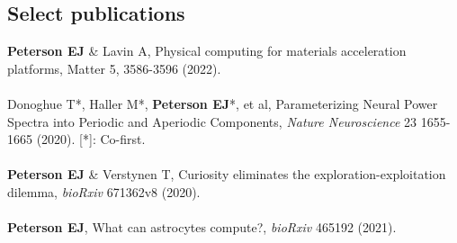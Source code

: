 \documentclass[margin,line]{res}
\begin{document}
\begin{resume}
\section{\sc Select publications}
\textbf{Peterson EJ} \& Lavin A, Physical computing for materials acceleration platforms, Matter 5, 3586-3596 (2022).
\\ 
\vspace{-.35cm} 
\\
Donoghue T*, Haller M*, \textbf{Peterson EJ}*, et al, Parameterizing Neural Power Spectra into Periodic and Aperiodic Components, \emph{Nature Neuroscience} 23 1655-1665 (2020). [*]: Co-first. 
\\ 
\vspace{-.35cm} 
\\
\textbf{Peterson EJ} \& Verstynen T, Curiosity eliminates the exploration-exploitation dilemma, \emph{bioRxiv} 671362v8 (2020). 
\\ 
\vspace{-.35cm} 
\\
\textbf{Peterson EJ}, What can astrocytes compute?, \emph{bioRxiv} 465192 (2021).

\end{resume}
\end{document}
